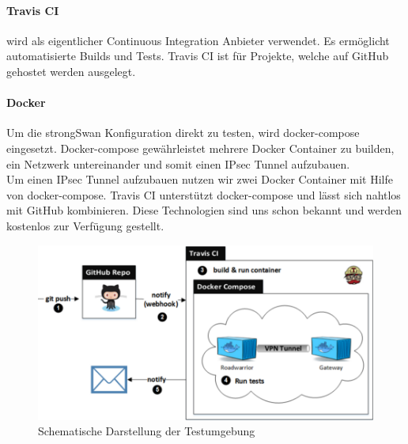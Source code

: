 \paragraph{Travis CI} wird als eigentlicher Continuous Integration Anbieter verwendet. Es ermöglicht automatisierte Builds und Tests. Travis CI ist für Projekte, welche auf GitHub gehostet werden ausgelegt.

\paragraph{Docker} Um die strongSwan Konfiguration direkt zu testen, wird docker-compose eingesetzt. Docker-compose gewährleistet mehrere Docker Container zu builden, ein Netzwerk untereinander und somit einen IPsec Tunnel aufzubauen. \\
Um einen IPsec Tunnel aufzubauen nutzen wir zwei Docker Container mit Hilfe von docker-compose. Travis CI unterstützt docker-compose und lässt sich nahtlos mit GitHub kombinieren. Diese Technologien sind uns schon bekannt und werden kostenlos zur Verfügung gestellt.


\begin{figure}[H]
\centering
\includegraphics[width=420pt]{images/testing.png}
\caption[Schematische Darstellung der Testumgebung]{Schematische Darstellung der Testumgebung}
\end{figure}
